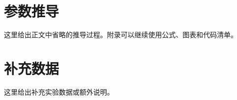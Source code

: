 \newpage
\appendix

\section{参数推导}
\label{app:parameter-derivation}

这里给出正文中省略的推导过程。附录可以继续使用公式、图表和代码清单。

\section{补充数据}
\label{app:supplementary-data}

这里给出补充实验数据或额外说明。
